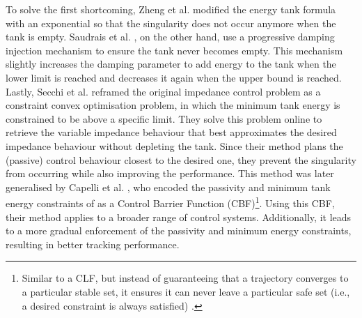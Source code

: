 To solve the first shortcoming, Zheng et al. \cite{zhengTimeVaryingImpedanceControl2018} modified the energy tank formula with an exponential so that the singularity does not occur anymore when the tank is empty. Saudrais et al. \cite{saudraisRateModeBilateral2021}, on the other hand, use a progressive damping injection mechanism to ensure the tank never becomes empty. This mechanism slightly increases the damping parameter to add energy to the tank when the lower limit is reached and decreases it again when the upper bound is reached. Lastly, Secchi et al. \cite{secchiEnergyOptimizationRobust2019} reframed the original impedance control problem as a constraint convex optimisation problem, in which the minimum tank energy is constrained to be above a specific limit. They solve this problem online to retrieve the variable impedance behaviour that best approximates the desired impedance behaviour without depleting the tank. Since their method plans the (passive) control behaviour closest to the desired one, they prevent the singularity from occurring while also improving the performance. This method was later generalised by Capelli et al. \cite{capelliPassivityControlBarrier2022}, who encoded the passivity and minimum tank energy constraints of \cite{secchiEnergyOptimizationRobust2019} as a Control Barrier Function (CBF)\footnote{Similar to a CLF, but instead of guaranteeing that a trajectory converges to a particular stable set, it ensures it can never leave a particular safe set (i.e., a desired constraint is always satisfied)  \cite{amesControlBarrierFunctions2019}.}. Using this CBF, their method applies to a broader range of control systems. Additionally, it leads to a more gradual enforcement of the passivity and minimum energy constraints, resulting in better tracking performance.

